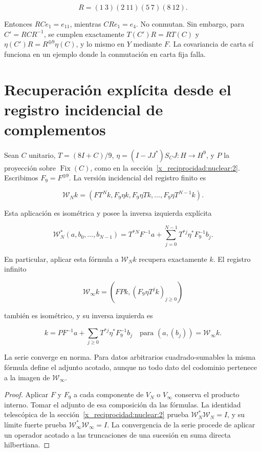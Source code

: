 \[
R=(1\ 3)(2\ 11)(5\ 7)(8\ 12).
\]

Entonces \(RCe_1=e_{11}\), mientras \(CRe_1=e_4\). No conmutan. Sin embargo, para \(C'=RCR^{-1}\), se cumplen exactamente \(T(C')R=RT(C)\) y \(\eta(C')R=R^{\oplus9}\eta(C)\), y lo mismo en \(Y\) mediante \(F\). La covariancia de carta sí funciona en un ejemplo donde la conmutación en carta fija falla.

\section{Recuperación explícita desde el registro incidencial de complementos}\label{x_reciprocidad:nuc05:recuperacion}

Sean \(C\) unitario, \(T=(8I+C)/9\), \(\eta=(I-JJ^*)S_CJ:H\to H^9\), y \(P\) la proyección sobre \(\operatorname{Fix}(C)\), como en la sección~\ref{x_reciprocidad:nuclear:2}. Escribimos \(F_9=F^{\oplus9}\). La versión incidencial del registro finito es

\[
\mathcal W_Nk=\left(FT^Nk,F_9\eta k,F_9\eta Tk,\ldots,F_9\eta T^{N-1}k\right).
\]

\begin{theorem}
Esta aplicación es isométrica y posee la inversa izquierda explícita

\[
\mathcal W_N^*(a,b_0,\ldots,b_{N-1})
=T^{*N}F^{-1}a+
\sum_{j=0}^{N-1}T^{*j}\eta^*F_9^{-1}b_j.
\]

En particular, aplicar esta fórmula a \(\mathcal W_Nk\) recupera exactamente \(k\). El registro infinito

\[
\mathcal W_\infty k=\left(FPk,(F_9\eta T^jk)_{j\ge0}\right)
\]

también es isométrico, y su inversa izquierda es

\[
k=PF^{-1}a+\sum_{j\ge0}T^{*j}\eta^*F_9^{-1}b_j
\quad\text{para }(a,(b_j))=\mathcal W_\infty k.
\]

La serie converge en norma. Para datos arbitrarios cuadrado-sumables la misma fórmula define el adjunto acotado, aunque no todo dato del codominio pertenece a la imagen de \(\mathcal W_\infty\).
\end{theorem}

\begin{proof}
Aplicar \(F\) y \(F_9\) a cada componente de \(V_N\) o \(V_\infty\) conserva el producto interno. Tomar el adjunto de esa composición da las fórmulas. La identidad telescópica de la sección~\ref{x_reciprocidad:nuclear:2} prueba \(\mathcal W_N^*\mathcal W_N=I\), y su límite fuerte prueba \(\mathcal W_\infty^*\mathcal W_\infty=I\). La convergencia de la serie procede de aplicar un operador acotado a las truncaciones de una sucesión en suma directa hilbertiana.
\end{proof}

